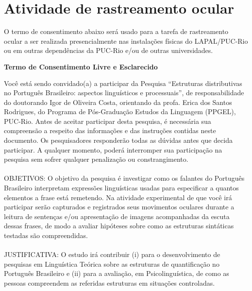 \section{Atividade de rastreamento ocular}
O termo de consentimento abaixo será usado para a tarefa de rastreamento ocular a ser realizada presencialmente nas instalações físicas do LAPAL/PUC-Rio ou em outras dependências da PUC-Rio e/ou de outras universidades.

\begin{center}
  \textbf{Termo de Consentimento Livre e Esclarecido}
\end{center}
Você está sendo convidado(a) a participar da Pesquisa ``Estruturas distributivas no Português Brasileiro: aspectos linguísticos e processuais'', de responsabilidade do doutorando Igor de Oliveira Costa, orientando da profa. Erica dos Santos Rodrigues, do Programa de Pós-Graduação Estudos da Linguagem (PPGEL), PUC-Rio. Antes de aceitar participar desta pesquisa, é necessária sua compreensão a respeito das informações e das instruções contidas neste documento. Os pesquisadores responderão todas as dúvidas antes que decida participar. A qualquer momento, poderá interromper sua participação na pesquisa sem sofrer qualquer penalização ou constrangimento.
\\
\\
OBJETIVOS: O objetivo da pesquisa é investigar como os falantes do Português Brasileiro interpretam expressões linguísticas usadas para especificar a quantos elementos a frase está remetendo. Na atividade experimental de que você irá participar serão capturados e registrados seus movimentos oculares durante a leitura de sentenças e/ou apresentação de imagens acompanhadas da escuta dessas frases, de modo a avaliar hipóteses sobre como as estruturas sintáticas testadas são compreendidas.
\\
\\
JUSTIFICATIVA: O estudo irá contribuir (i) para o desenvolvimento de pesquisas em Linguística Teórica sobre as estruturas de quantificação no Português Brasileiro e (ii) para a avaliação, em Psicolinguística, de como as pessoas compreendem as referidas estruturas em situações controladas.
\\
\\
